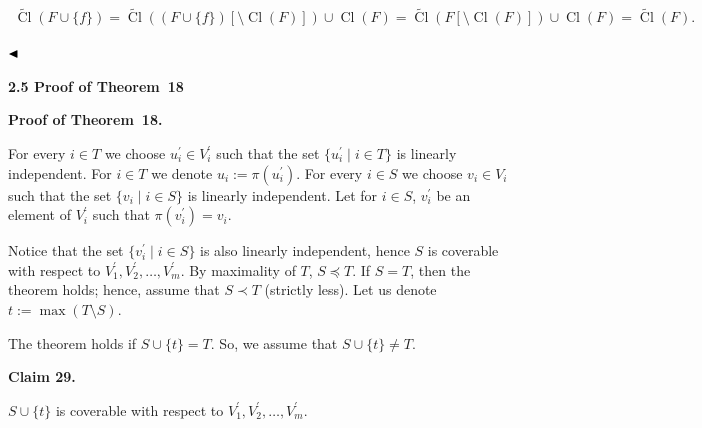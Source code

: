  
\[\begin{gathered}\widetilde{\mathop{\mathrm{Cl}}}(F\cup\{f\})=\widetilde{\mathop{\mathrm{Cl}}}((F\cup\{f\})[\setminus\mathop{\mathrm{Cl}}(F)])\cup\mathop{\mathrm{Cl}}(F)=\widetilde{\mathop{\mathrm{Cl}}}(F[\setminus\mathop{\mathrm{Cl}}(F)])\cup\mathop{\mathrm{Cl}}(F)=\widetilde{\mathop{\mathrm{Cl}}}(F).\ \end{gathered}\] 
 




$\hfill\blacktriangleleft$\par


\par\medskip\noindent\textbf{
2.5 Proof of Theorem 18
}\par

\par\medskip\noindent\textbf{Proof of Theorem 18.}\par


For every $i\in T$ we choose $u_{i}^{\prime}\in V^{\prime}_{i}$ such that the set $\{u^{\prime}_{i}\mid i\in T\}$ is linearly independent. For $i\in T$ we denote $u_{i}:=\pi(u^{\prime}_{i})$. For every $i\in S$ we choose $v_{i}\in V_{i}$ such that the set
$\{v_{i}\mid i\in S\}$ is linearly independent. Let for $i\in S$, $v^{\prime}_{i}$ be an element of $V_{i}^{\prime}$ such that $\pi(v^{\prime}_{i})=v_{i}$.\par



Notice that the set $\{v^{\prime}_{i}\mid i\in S\}$ is also linearly independent, hence $S$ is coverable with respect to $V^{\prime}_{1},V^{\prime}_{2},\dots,V^{\prime}_{m}$. By maximality of $T$, $S\preceq T$. If $S=T$, then the theorem holds; hence, assume that $S\prec T$ (strictly less).
Let us denote $t:=\max(T\setminus S)$.\par



The theorem holds if $S\cup\{t\}=T$. So, we assume that $S\cup\{t\}\neq T$.\par



\par\medskip\noindent\textbf{
Claim 29. 
}\par



$S\cup\{t\}$ is coverable with respect to $V^{\prime}_{1},V^{\prime}_{2},\dots,V^{\prime}_{m}$.\par



